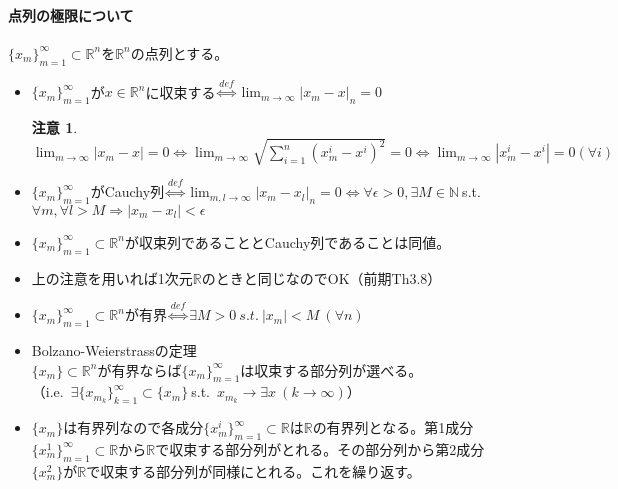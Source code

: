 \documentclass[dvipdfmx,a4j,10pt]{jsarticle}
\makeatletter
\theoremstyle{mystyle1}
\theoremstyle{mystyle2}
\newtheorem{note}{注意}
\renewenvironment{proof}[1][\proofname]{\par
  \pushQED{\qed}%
  \normalfont
  \topsep6\p@\@plus6\p@ \trivlist
  \item[\hskip\labelsep{\bfseries\sffamily #1}]\ignorespaces
}{%
  \popQED\endtrivlist\@endpefalse
}
\renewcommand\proofname{証明}
\makeatother
\begin{document}
\paragraph{点列の極限について}
$\{x_m\}_{m=1}^\infty\subset\mathbb{R}^n$を$\mathbb{R}^n$の点列とする。
\begin{itemize}
	\item $\displaystyle\{x_m\}_{m=1}^\infty $が$x\in\mathbb{R}^n$に収束する$\displaystyle\overset{def}{\Leftrightarrow}\lim_{m\to\infty}|x_m-x|_n=0$
	\begin{note}
	$\displaystyle \lim_{m\to\infty}|x_m-x|=0\Leftrightarrow\lim_{m\to\infty}\sqrt{\sum_{i=1}^n(x_m^i-x^i)^2}=0\Leftrightarrow\lim_{m\to\infty}|x_m^i-x^i|=0 (\forall i)$
	\end{note}
	\item $\displaystyle\{x_m\}_{m=1}^\infty $がCauchy列$\displaystyle\overset{def}{\Leftrightarrow}\lim_{m,l\to\infty}|x_m-x_l|_n=0\Leftrightarrow\forall\epsilon>0,\exists M\in\mathbb{N}\ $s.t.\ $\forall m,\forall l>M \Rightarrow |x_m-x_l|<\epsilon$
	\item $\{x_m\}_{m=1}^\infty\subset\mathbb{R}^n$が収束列であることとCauchy列であることは同値。
	\begin{proof}
	上の注意を用いれば1次元$\mathbb{R}$のときと同じなのでOK（前期Th3.8）
	\end{proof}
	\item $\{x_m\}_{m=1}^\infty\subset\mathbb{R}^n$が有界$\overset{def}{\Leftrightarrow} \exists M>0\ s.t.\ |x_m|<M\ (\forall n)$
	\item Bolzano-Weierstrassの定理\\
	$\{x_m\}\subset\mathbb{R}^n$が有界ならば$\{x_m\}_{m=1}^\infty$は収束する部分列が選べる。\\
	（i.e.\ $\exists\{x_{m_k}\}_{k=1}^\infty\subset\{x_m\}\ $s.t.\ $x_{m_k}\to\exists x\ (k\to\infty)$）
	\begin{proof}
	$\{x_m\}$は有界列なので各成分$\{x_m^i\}_{m=1}^\infty\subset\mathbb{R}$は$\mathbb{R}$の有界列となる。第1成分$\{x^1_m\}_{m=1}^\infty\subset\mathbb{R}$から$\mathbb{R}$で収束する部分列がとれる。その部分列から第2成分$\{x_m^2\}$が$\mathbb{R}$で収束する部分列が同様にとれる。これを繰り返す。
	\end{proof}
\end{itemize}


\newpage
\end{document}
